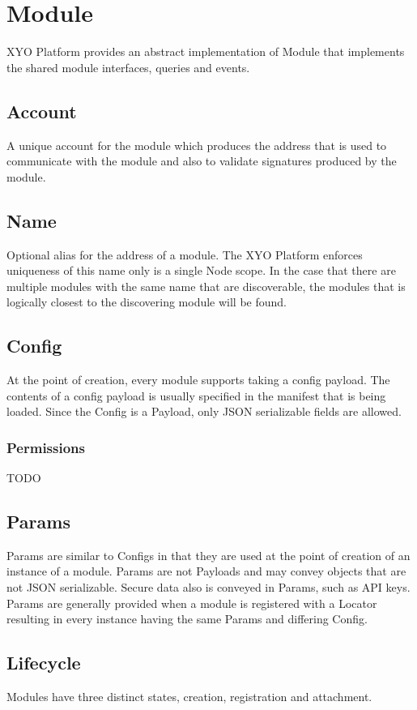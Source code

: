 \documentclass{article}
\begin{document}
\section{Module}
XYO Platform provides an abstract implementation of Module that implements the shared module interfaces, queries and events.
\subsection{Account}
A unique account for the module which produces the address that is used to communicate with the module and also to validate signatures produced by the module.
\subsection{Name}
Optional alias for the address of a module.  The XYO Platform enforces uniqueness of this name only is a single Node scope.  In the case that there are multiple modules with the same name that are discoverable, the modules that is logically closest to the discovering module will be found.

\subsection{Config}
At the point of creation, every module supports taking a config payload.  The contents of a config payload is usually specified in the manifest that is being loaded.  Since the Config is a Payload, only JSON serializable fields are allowed.
\subsubsection{Permissions}
TODO
\subsection{Params}
Params are similar to Configs in that they are used at the point of creation of an instance of a module.  Params are not Payloads and may convey objects that are not JSON serializable.  Secure data also is conveyed in Params, such as API keys.  Params are generally provided when a module is registered with a Locator resulting in every instance having the same Params and differing Config.

\subsection{Lifecycle}
Modules have three distinct states, creation, registration and attachment.
\end{document}
